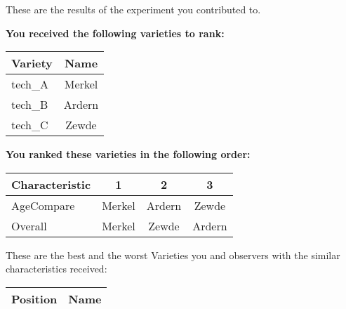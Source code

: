 \documentclass[10pt]{article}
\begin{document}
\begin{titlepage}
	These are the results of the experiment you contributed to.

	\begin{flushleft}
		\textbf{You received the following varieties to rank: }\hfill \break
		\begin{tabularx}{\textwidth}{ X | c  }
			\hline
			\textbf{Variety} & \textbf{Name} \\ \hline

			
				tech\_A & Merkel \\ \hline
			
				tech\_B & Ardern \\ \hline
			
				tech\_C & Zewde \\ \hline
			


		\end{tabularx}\newline \newline

		\textbf{You ranked these varieties in the following order: }\hfill \break
		\begin{tabularx}{\textwidth}{ X | c | c | c  }
			\hline
			\textbf{Characteristic}
			
				& \textbf{ 1 }
			
				& \textbf{ 2 }
			
				& \textbf{ 3 }
			
			\\ \hline


			
				AgeCompare & Merkel  & Ardern  & Zewde  \\ \hline


			
				Overall & Merkel  & Zewde  & Ardern  \\ \hline


			

		\end{tabularx}

	\end{flushleft}

	\pagebreak

	\begin{flushleft}
		These are the best and the worst Varieties you and observers with the similar characteristics received:\hfill \break \newline
		\begin{tabularx}{\textwidth}{ X | X  }
			\hline
			\textbf{Position} & \textbf{Name} \\ \hline


\end{tabularx}
\end{flushleft}
\end{titlepage}
\end{document}
